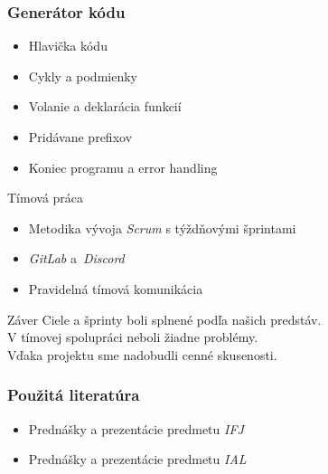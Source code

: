 \documentclass[10pt, hyperref={unicode}, xcolor=pdflatex]{beamer}
\begin{document}
\begin{frame}\frametitle{Generátor kódu}
    \begin{figure}[h]
    \end{figure}
    \begin{itemize}
        \item Hlavička kódu
        \item Cykly a podmienky
        \item Volanie a deklarácia funkcií
        \item Pridávane prefixov
        \item Koniec programu a error handling
    \end{itemize}
\end{frame}

\begin{frame}{Tímová práca}
    \begin{itemize}
        \item Metodika vývoja \emph{Scrum} s týždňovými šprintami
        \item \emph{GitLab} a~\emph{Discord}
        \item Pravidelná tímová komunikácia
    \end{itemize}
\end{frame}

\begin{frame}{Záver}
    Ciele a šprinty boli splnené podľa našich predstáv. \\ V tímovej spolupráci neboli žiadne problémy. \\ Vďaka projektu sme nadobudli cenné skusenosti.
\end{frame}

\begin{frame}\frametitle{Použitá literatúra}
    \begin{itemize}
        \item Prednášky a prezentácie predmetu \emph{IFJ}
        \item Prednášky a prezentácie predmetu \emph{IAL}
    \end{itemize}
\end{frame}

\end{document}
